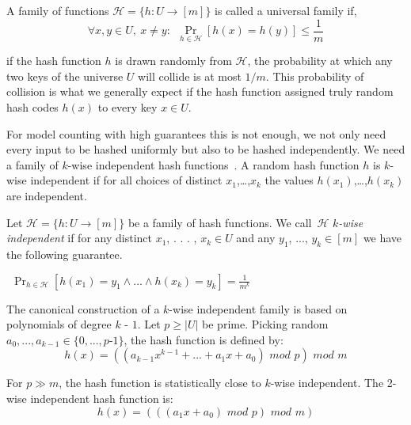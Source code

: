 \documentclass{svproc}
\newcommand{\hash}{$\mathcal{H}$}
\begin{document}
\begin{definition}
A family of functions $\mathcal{H}=\{h: U \to [m]\}$  is called a universal family if,
\[ \forall x,y\in U,~x\neq y:~~\Pr _{h\in \mathcal{H}}[h(x)=h(y)]\leq {\frac {1}{m}} \]
\end{definition}

if the hash function $h$ is drawn randomly from \hash, the probability at which any two keys of the universe $U$ will collide is at most $1/m$.
%
This probability of collision is what we generally expect if the hash function assigned truly random hash codes $h(x)$ to every key $x \in U$.

For model counting with high guarantees this is not enough, we not only need every input to be hashed uniformly but also to be hashed independently. We need a family of $k$-wise independent hash functions~\cite{DBLP:conf/focs/WegmanC79}.
%
A random hash function $h$ is $k$-wise independent if for all choices of distinct $x_1$,…,$x_k$ the values $h(x_1)$,…,$h(x_k)$ are independent.
\begin{definition}
	Let $\mathcal{H}=\{h: U \to [m]\}$ be a family of hash functions. We call~$\mathcal{H}$ \emph{$k$-wise independent} if for any distinct $x_1$, . . . , $x_k \in U$ and any $y_1$, ..., $y_k \in [m]$ we have the following guarantee.

	$~~\Pr_{h\in \mathcal{H}}
	[h(x_1) = y_1 \land ... \land h(x_k) = y_k] = \frac {1}
	{m^
		k}$
\end{definition}


The canonical construction of a $k$-wise independent family is based on polynomials
of degree $k$ - $1$. Let $p \geq |U|$ be prime. Picking random $a_0,...,a_{k - 1} \in \{0, . . . , p$-$ 1\}$,
the hash function is defined by:
\[ h(x) = ( ( a_{k-1} x^ {k - 1} + ... + a_1 x + a_0) \,\, mod \,\, p) \,\, mod \,\,  m\]


For $p \gg	 m$, the hash function is statistically close to $k$-wise independent. The 2-wise independent hash function is:
\[ h(x) = (((a_1 x + a_0) \,\, mod \,\, p) \,\, mod \,\, m ) \]
\end{document}
